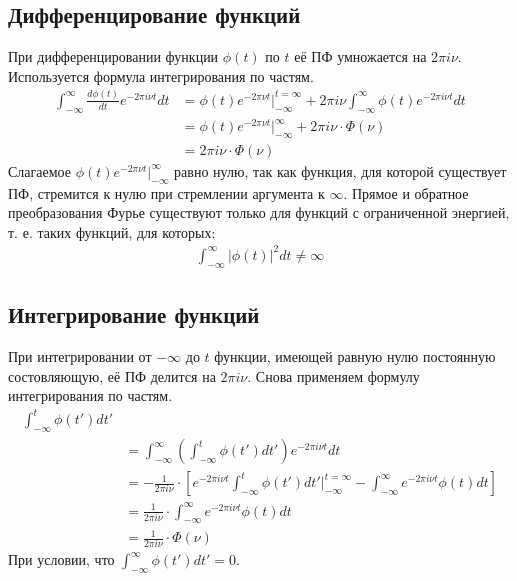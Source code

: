 \documentclass[a4paper, 12pt]{report}
\begin{document}
	\subsection{Дифференцирование функций}
	При дифференцировании функции $\phi(t)$ по $t$ её ПФ умножается на $2\pi i \nu$. Используется формула интегрирования по частям.
	\[
        		\begin{aligned}
            		\int_{-\infty}^{\infty} \frac{d\phi(t)}{dt} e^{-2\pi i\nu t} dt
			&= \phi(t) e^{-2\pi\nu t} \bigg|_{-\infty}^{t = \infty} + 2\pi i\nu \int_{-\infty}^{\infty} \phi(t) e^{-2\pi i\nu t} dt \\
			&= \phi(t) e^{-2\pi\nu t} \bigg|_{-\infty}^{\infty} + 2\pi i\nu \cdot \Phi(\nu) \\
			&= 2\pi i\nu \cdot \Phi(\nu)
        		\end{aligned}
    	\]
	Слагаемое  $\phi(t) e^{-2\pi\nu t} \bigg|_{-\infty}^{\infty}$ равно нулю, так как функция, для которой существует ПФ, стремится к нулю при стремлении аргумента к $\infty$. Прямое и обратное преобразования Фурье существуют только для функций с ограниченной энергией, т. е. таких функций, для которых:
	\[
        		\begin{aligned}
            		\int_{-\infty}^{\infty} |\phi(t)|^2 dt \neq \infty
        		\end{aligned}
    	\]

	\subsection{Интегрирование функций}
	При интегрировании от $-\infty$ до $t$ функции, имеющей равную нулю постоянную состовляющую, её ПФ делится на $2\pi i \nu$. Снова применяем формулу интегрирования по частям.
	\[
        		\begin{aligned}
            		\int_{-\infty}^{t} \phi(t') dt' \\
 &=\int_{-\infty}^{\infty} \left( \int_{-\infty}^{t} \phi(t') dt' \right) e^{-2\pi i\nu t} dt \\
            		&= -\frac{1}{2\pi i\nu} \cdot \left[ e^{-2\pi i\nu t} \int_{-\infty}^{t} \phi(t') dt' \biggr|_{-\infty}^{t = \infty} - \int_{-\infty}^{\infty} e^{-2\pi i\nu t} \phi(t) dt\right] \\
            		&= \frac{1}{2\pi i\nu} \cdot \int_{-\infty}^{\infty} e^{-2\pi i\nu t} \phi(t) dt \\
            		&= \frac{1}{2\pi i\nu} \cdot \Phi(\nu)
        		\end{aligned}
    	\]
	При условии, что  $\int_{-\infty}^{\infty} \phi(t') dt' = 0$.
\end{document}
